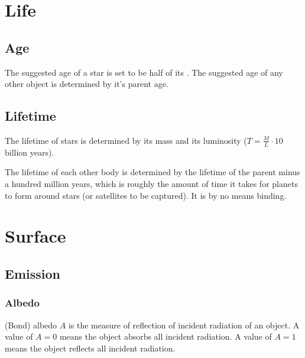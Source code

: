 \documentclass[letterpaper,10pt,english]{sphinxmanual}
\begin{document}
\section{Life}
\label{\detokenize{quantities/life/life:life}}\label{\detokenize{quantities/life/life::doc}}

\subsection{Age}
\label{\detokenize{quantities/life/age:age}}\label{\detokenize{quantities/life/age::doc}}\label{\detokenize{quantities/life/age:id1}}
\sphinxAtStartPar
The suggested age of a star is set to be half of its {\hyperref[\detokenize{quantities/life/lifetime:id1}]{}}.
The suggested age of any other object is determined by it’s
parent age.


\subsection{Lifetime}
\label{\detokenize{quantities/life/lifetime:lifetime}}\label{\detokenize{quantities/life/lifetime::doc}}\label{\detokenize{quantities/life/lifetime:id1}}
\sphinxAtStartPar
The lifetime of stars is determined by its mass and its luminosity (\(T=\frac{M}{L} \cdot 10\) billion years).

\sphinxAtStartPar
The lifetime of each other body is determined by the lifetime of the parent
minus a hundred million years, which is roughly the amount of time it takes
for planets to form around stars (or satellites to be captured). It is by
no means binding.


\section{Surface}
\label{\detokenize{quantities/surface/surface:surface}}\label{\detokenize{quantities/surface/surface::doc}}\label{\detokenize{quantities/surface/surface:id1}}

\subsection{Emission}
\label{\detokenize{quantities/surface/emission/emission:emission}}\label{\detokenize{quantities/surface/emission/emission::doc}}\label{\detokenize{quantities/surface/emission/emission:id1}}

\subsubsection{Albedo}
\label{\detokenize{quantities/surface/emission/albedo:albedo}}\label{\detokenize{quantities/surface/emission/albedo::doc}}\label{\detokenize{quantities/surface/emission/albedo:id1}}
\sphinxAtStartPar
(Bond) albedo \(A\) is the measure of reflection of incident radiation of an object.
A value of \(A = 0\) means the object absorbs all incident radiation.
A value of \(A = 1\) means the object reflects all incident radiation.
\end{document}
